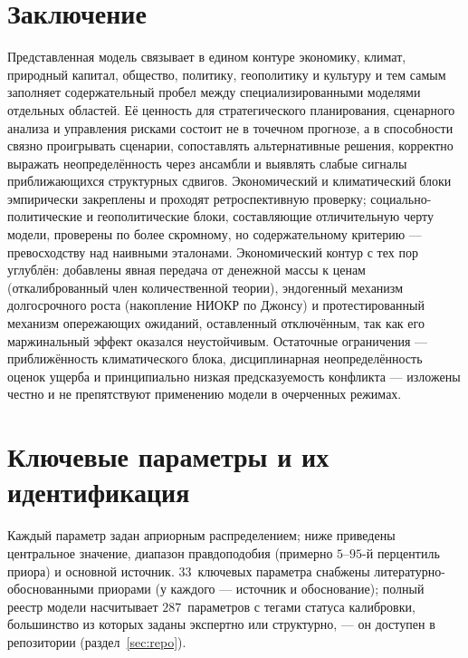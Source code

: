 \documentclass[11pt,a4paper]{article}
\begin{document}
\section{Заключение}

Представленная модель связывает в едином контуре экономику, климат, природный капитал,
общество, политику, геополитику и культуру и тем самым заполняет содержательный пробел
между специализированными моделями отдельных областей. Её ценность для стратегического
планирования, сценарного анализа и управления рисками состоит не в точечном прогнозе, а в
способности связно проигрывать сценарии, сопоставлять альтернативные решения, корректно
выражать неопределённость через ансамбли и выявлять слабые сигналы приближающихся
структурных сдвигов. Экономический и климатический блоки эмпирически закреплены и проходят
ретроспективную проверку; социально-политические и геополитические блоки, составляющие
отличительную черту модели, проверены по более скромному, но содержательному критерию ---
превосходству над наивными эталонами. Экономический контур с тех пор углублён: добавлены явная передача от денежной массы к ценам
(откалиброванный член количественной теории), эндогенный механизм долгосрочного роста (накопление
НИОКР по Джонсу) и протестированный механизм опережающих ожиданий, оставленный отключённым, так как
его маржинальный эффект оказался неустойчивым. Остаточные ограничения --- приближённость
климатического блока, дисциплинарная неопределённость оценок ущерба и принципиально низкая
предсказуемость конфликта --- изложены честно и не препятствуют применению модели в очерченных режимах.

\newpage

\appendix
\section{Ключевые параметры и их идентификация}
\label{app:params}

Каждый параметр задан априорным распределением; ниже приведены центральное значение,
диапазон правдоподобия (примерно $5$--$95$-й перцентиль приора) и основной источник. $33$~ключевых параметра
снабжены литературно-обоснованными приорами (у каждого --- источник и обоснование); полный реестр
модели насчитывает $287$~параметров с тегами статуса калибровки, большинство из которых заданы
экспертно или структурно, --- он доступен в репозитории (раздел~\ref{sec:repo}).
\end{document}
